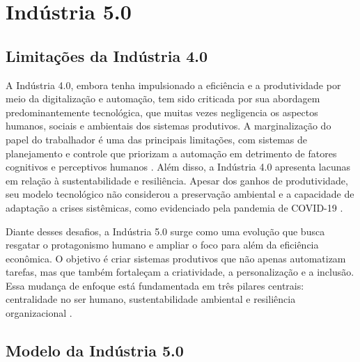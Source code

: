 
\chapter{Indústria 5.0}\label{cap:indutria5_0}

\section{Limitações da Indústria 4.0}


A Indústria 4.0, embora tenha impulsionado a eficiência e a produtividade por meio da digitalização e automação, tem sido criticada por sua abordagem predominantemente tecnológica, que muitas vezes negligencia os aspectos humanos, sociais e ambientais dos sistemas produtivos.
A marginalização do papel do trabalhador é uma das principais limitações, com sistemas de planejamento e controle que priorizam a automação em detrimento de fatores cognitivos e perceptivos humanos \cite{RANNERTSHAUSER2022}.
Além disso, a Indústria 4.0 apresenta lacunas em relação à sustentabilidade e resiliência. Apesar dos ganhos de produtividade, seu modelo tecnológico não considerou a preservação ambiental e a capacidade de adaptação a crises sistêmicas, como evidenciado pela pandemia de COVID-19 \cite{euCommission2021, Khan2023}.

Diante desses desafios, a Indústria 5.0 surge como uma evolução que busca resgatar o protagonismo humano e ampliar o foco para além da eficiência econômica.
O objetivo é criar sistemas produtivos que não apenas automatizam tarefas, mas que também fortaleçam a criatividade, a personalização e a inclusão.
Essa mudança de enfoque está fundamentada em três pilares centrais: centralidade no ser humano, sustentabilidade ambiental e resiliência organizacional \cite{euCommission2021, Nahavandi2019}.

\section{Modelo da Indústria 5.0}

